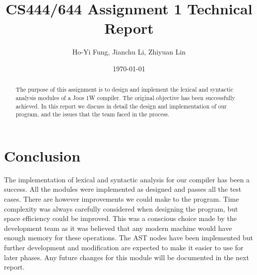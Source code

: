 \documentclass[notitlepage]{report}
\title{CS444/644 Assignment 1 Technical Report}
\author{Ho-Yi Fung, Jianchu Li, Zhiyuan Lin}
\date{\today}
\begin{document}
{\let\newpage\relax\maketitle}
\begin{abstract}
The purpose of this assignment is to design and implement the lexical and syntactic analysis modules of a Joos 1W compiler. The original objective has been successfully achieved. In this report we discuss in detail the design and implementation of our program, and the issues that the team faced in the process.
\end{abstract}


\tableofcontents











\chapter{Conclusion}
The implementation of lexical and syntactic analysis for our compiler has been a success. All the modules were implemented as designed and passes all the test cases. There are however improvements we could make to the program. Time complexity was always carefully considered when designing the program, but space efficiency could be improved. This was a conscious choice made by the development team as it was believed that any modern machine would have enough memory for these operations. The AST nodes have been implemented but further development and modification are expected to make it easier to use for later phases. Any future changes for this module will be documented in the next report.



\end{document}
